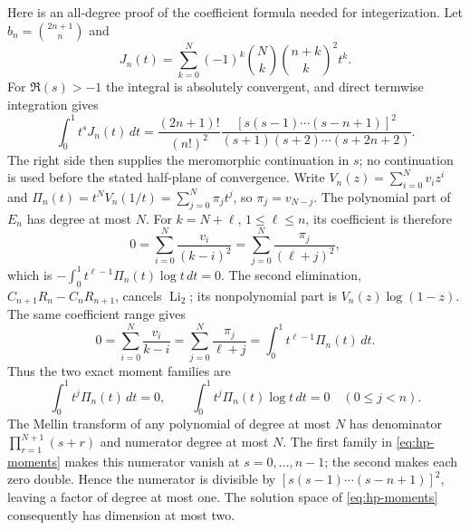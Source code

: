 Here is an all-degree proof of the coefficient formula needed for
integerization.  Let $b_n=\binom{2n+1}{n}$ and
\[
 J_n(t)=\sum_{k=0}^{N}(-1)^k\binom Nk\binom{n+k}{k}^{\!2}t^k.
\]
For $\Re(s)>-1$ the integral is absolutely convergent, and direct
termwise integration gives
\begin{equation}\label{eq:hp-mellin}
 \int_0^1t^sJ_n(t)\,dt=
 \frac{(2n+1)!}{(n!)^2}
 \frac{[s(s-1)\cdots(s-n+1)]^2}
      {(s+1)(s+2)\cdots(s+2n+2)}.
\end{equation}
The right side then supplies the meromorphic continuation in $s$; no
continuation is used before the stated half-plane of convergence.
Write $V_n(z)=\sum_{i=0}^Nv_i z^i$ and
$\Pi_n(t)=t^NV_n(1/t)=\sum_{j=0}^N\pi_jt^j$, so $\pi_j=v_{N-j}$.
The polynomial part of $E_n$ has degree at most $N$.  For
$k=N+\ell$, $1\le\ell\le n$, its coefficient is therefore
\[
 0=\sum_{i=0}^N\frac{v_i}{(k-i)^2}
   =\sum_{j=0}^N\frac{\pi_j}{(\ell+j)^2},
\]
which is $-\int_0^1t^{\ell-1}\Pi_n(t)\log t\,dt=0$.  The second
elimination, $C_{n+1}R_n-C_nR_{n+1}$, cancels $\operatorname{Li}_2$;
its nonpolynomial part is $V_n(z)\log(1-z)$.  The same coefficient range
gives
\[
 0=\sum_{i=0}^N\frac{v_i}{k-i}
   =\sum_{j=0}^N\frac{\pi_j}{\ell+j}
   =\int_0^1t^{\ell-1}\Pi_n(t)\,dt.
\]
Thus the two exact moment families are
\begin{equation}\label{eq:hp-moments}
 \int_0^1t^j\Pi_n(t)\,dt=0,\qquad
 \int_0^1t^j\Pi_n(t)\log t\,dt=0\quad(0\le j<n).
\end{equation}
The Mellin transform of any
polynomial of degree at most $N$ has denominator
$\prod_{r=1}^{N+1}(s+r)$ and numerator degree at most $N$.  The first family
in \eqref{eq:hp-moments} makes this numerator vanish at $s=0,\ldots,n-1$;
the second makes each zero double.  Hence the numerator is divisible by
$[s(s-1)\cdots(s-n+1)]^2$, leaving a factor of degree at most one.  The
solution space of \eqref{eq:hp-moments} consequently has dimension at most
two.

